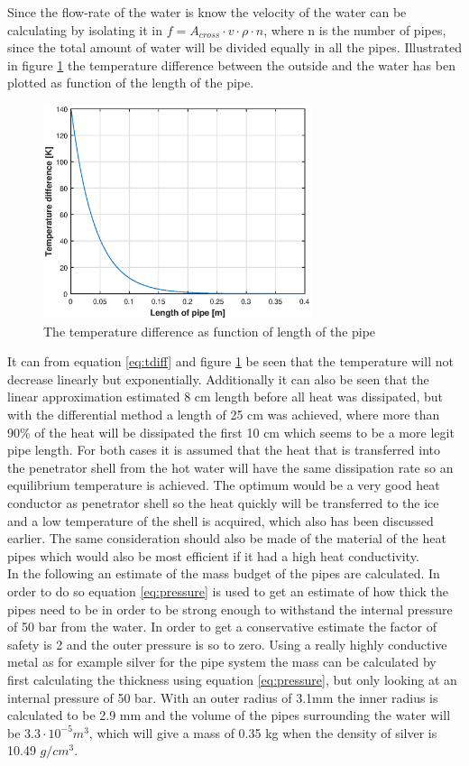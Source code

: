 Since the flow-rate of the water is know the velocity of the water can be calculating by isolating it in $f = A_{cross}\cdot v \cdot \rho \cdot n$, where n is the number of pipes, since the total amount of water will be divided equally in all the pipes. Illustrated in figure \ref{fig:watercool} the temperature difference between the outside and the water has ben plotted as function of the length of the pipe. 
\begin{figure}[htb]
  \centering
  \includegraphics[width=0.7\textwidth]{figures/Ricardo/watercooling.eps}
  \caption{The temperature difference as function of length of the pipe}
  \label{fig:watercool}
\end{figure}
It can from equation \ref{eq:tdiff} and figure \ref{fig:watercool} be seen that the temperature will not decrease linearly but exponentially. Additionally it can also be seen that the linear approximation estimated 8 cm length before all heat was dissipated, but with the differential method a length of 25 cm was achieved, where more than 90\% of the heat will be dissipated the first 10 cm which seems to be a more legit pipe length. For both cases it is assumed that the heat that is transferred into the penetrator shell from the hot water will have the same dissipation rate so an equilibrium temperature is achieved. The optimum would be a very good heat conductor as penetrator shell so the heat quickly will be transferred to the ice and a low temperature of the shell is acquired, which also has been discussed earlier. The same consideration should also be made of the material of the heat pipes which would also be most efficient if it had a high heat conductivity. \\

\noindent 
In the following an estimate of the mass budget of the pipes are calculated. In order to do so equation \ref{eq:pressure} is used to get an estimate of how thick the pipes need to be in order to be strong enough to withstand the internal pressure of 50 bar from the water. In order to get a conservative estimate the factor of safety is 2 and the outer pressure is so to zero. Using a really highly conductive metal as for example silver for the pipe system the mass can be calculated by first calculating the thickness using equation \ref{eq:pressure}, but only looking at an internal pressure of 50 bar. With an outer radius of 3.1mm the inner radius is calculated to be 2.9 mm and the volume of the pipes surrounding the water will be $3.3 \cdot 10^{-5} m^3$, which will give a mass of 0.35 kg when the density of silver is 10.49 $g/cm^3$. 

